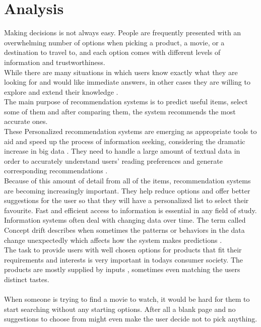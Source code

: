 \documentclass[10pt,oneside,english,a4paper]{article}
\begin{document}
\section{Analysis}
Making decisions is not always easy. People are frequently presented with an overwhelming number of options when picking a product, a movie, or a destination to travel to, and each option comes with different levels of information and trustworthiness. \\
While there are many situations in which users know exactly what they are looking for and would like immediate answers, in other cases they are willing to explore and extend their knowledge \cite{Blanco201333}.\\
The main purpose of recommendation systems is to predict useful items, select some of them and after comparing them, the system recommends the most accurate ones.\\ 
These Personalized recommendation systems are emerging as appropriate tools to aid and speed up the process of information seeking, considering the dramatic increase in big data \cite{Haruna2017}. They need to handle a large amount of textual data in order to accurately understand users’ reading preferences and generate corresponding recommendations \cite{Yan2024}. \\
%
Because of this amount of detail from all of the items, recommendation systems are becoming increasingly important. They help reduce options and offer better suggestions for the user so that they will have a personalized list to select their favourite. Fast and efficient access to information is essential in any field of study. Information systems often deal with changing data over time. The term called Concept drift describes when sometimes the patterns or behaviors in the data change unexpectedly which affects how the system makes predictions \cite{Sun2024}.\\
The task to provide users with well chosen options for products that fit their requirements and interests is very important in todays consumer society. The products are mostly supplied by inputs \cite{Philip2014} , sometimes even matching the users distinct tastes.\\\\
%
When someone is trying to find a movie to watch, it would be hard for them to start searching without any starting options. After all a blank page and no suggestions to choose from might even make the user decide not to pick anything. \\\\
\end{document}
